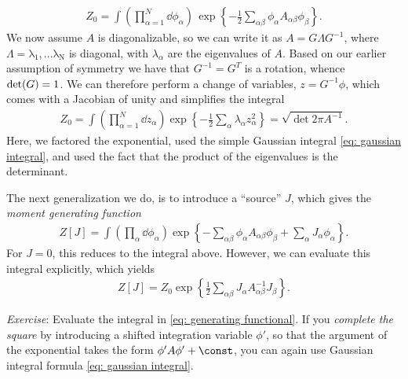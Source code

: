 %
\begin{align}
    Z_0 = \int \left( \prod_{\alpha=1}^N \dd \phi_\alpha \right) \, 
    \exp \left\{ 
        - \frac{1}{2} \sum_{\alpha \beta} 
        \phi_\alpha A_{\alpha \beta} \phi_\beta
    \right\}.
\end{align}
%
We now assume $A$ is diagonalizable, so we can write it as $A = G \Lambda G^{-1} $, where $\Lambda = \mathrm{\lambda_1, ... \lambda_N}$ is diagonal, with $\lambda_\alpha$ are the eigenvalues of $A$. Based on our earlier assumption of symmetry we have that $G^{-1}=G^T$ is a rotation, whence ${\rm det}(G)=1$.
We can therefore perform a change of variables, $z = G^{-1}\phi$, which comes with a Jacobian of unity and simplifies the integral
%
\begin{align}\label{eq: gaussian integral}
    Z_0 
    = 
    \int \left( \prod_{\alpha=1}^N \dd z_\alpha \right)
    \exp \left\{ - \frac{1}{2} \sum_{\alpha} \lambda_\alpha z_\alpha^2 \right\}
    =
    \sqrt{ \det 2 \pi A^{-1} }.
\end{align}
%
Here, we factored the exponential, used the simple Gaussian integral \autoref{eq: gaussian integral}, and used the fact that the product of the eigenvalues is the determinant. 


The next generalization we do, is to introduce a ``source'' $J$, which gives the \emph{moment generating function}
%
\begin{align}\label{eq: generating functional}
    Z[J] = \int \left(\prod_\alpha  \dd \phi_\alpha \right) \exp \left\{ - \sum_{\alpha \beta} \phi_\alpha A_{\alpha \beta} \phi_\beta + \sum_\alpha J_\alpha \phi_\alpha \right\}.
\end{align}
%
For $J = 0$, this reduces to the integral above.
However, we can evaluate this integral explicitly, which yields
%
\begin{align}
    Z[J] = Z_0 \exp \left\{ \frac{ 1 }{ 2 }  \sum_{\alpha \beta} J_\alpha A_{\alpha \beta}^{-1} J_\beta \right\}.
\end{align}
%

\begin{framed}\noindent
\textit{Exercise}: Evaluate the integral in \autoref{eq: generating functional}.
If you \emph{complete the square} by introducing a shifted integration variable $\phi'$, so that the argument of the exponential takes the form $\phi' A \phi' + \const$, you can again use Gaussian integral formula \autoref{eq: gaussian integral}.
\end{framed}


